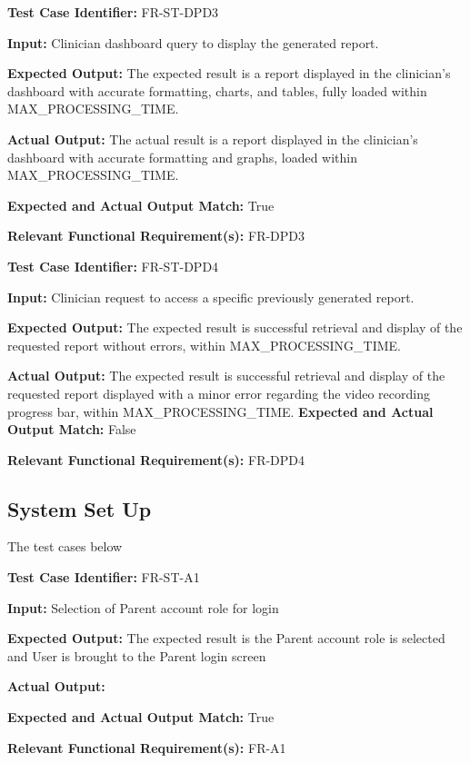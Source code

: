 \documentclass[12pt, titlepage]{article}
\begin{document}
\begin{mdframed}[linewidth=0.5mm] \par
  \textbf{Test Case Identifier:} FR-ST-DPD3 \par
  \textbf{Input:} Clinician dashboard query to display the generated report. \par
  \textbf{Expected Output:} The expected result is a report displayed in the clinician’s dashboard with accurate formatting, charts, and tables, fully loaded within MAX\_PROCESSING\_TIME. \par
  \textbf{Actual Output:} The actual result is a report displayed in the clinician’s dashboard with accurate formatting and graphs, loaded within \\MAX\_PROCESSING\_TIME. \par
  \textbf{Expected and Actual Output Match:} True \par
  \textbf{Relevant Functional Requirement(s):} FR-DPD3
\end{mdframed}

\begin{mdframed}[linewidth=0.5mm] \par
  \textbf{Test Case Identifier:} FR-ST-DPD4 \par
  \textbf{Input:} Clinician request to access a specific previously generated report. \par
  \textbf{Expected Output:} The expected result is successful retrieval and display of the requested report without errors, within MAX\_PROCESSING\_TIME. \par
  \textbf{Actual Output:} The expected result is successful retrieval and display of the requested report displayed with a minor error regarding the video recording progress bar, within MAX\_PROCESSING\_TIME.
  \textbf{Expected and Actual Output Match:} False \par
  \textbf{Relevant Functional Requirement(s):} FR-DPD4
\end{mdframed}

\subsection{System Set Up}
\hspace{2em}The test cases below 

\begin{mdframed}[linewidth=0.5mm] \par
  \textbf{Test Case Identifier:} FR-ST-A1 \par
  \textbf{Input:} Selection of Parent account role for login \par
  \textbf{Expected Output:} The expected result is the Parent account role is selected and User is brought to the Parent login screen \par
  \textbf{Actual Output:} \par
  \textbf{Expected and Actual Output Match:} True \par
  \textbf{Relevant Functional Requirement(s):} FR-A1
\end{mdframed}
\end{document}
